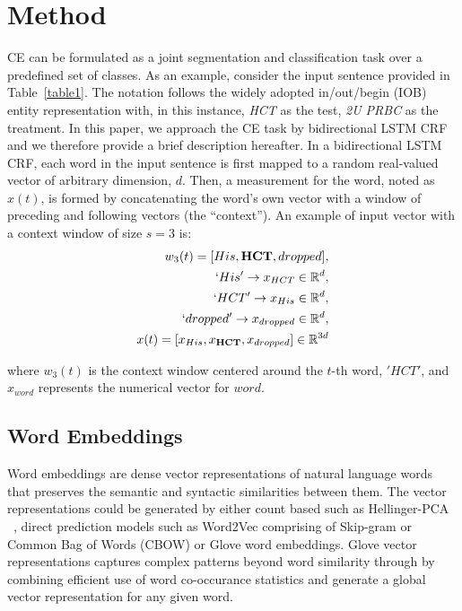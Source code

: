 \section{Method}
\label{sec:method}
CE can be formulated as a joint segmentation and classification task over a predefined set of classes. As an example, consider the input sentence provided in Table~\ref{table1}. The notation follows the widely adopted in/out/begin (IOB) entity representation with, in this instance, \textit{HCT} as the test, \textit{2U PRBC} as the treatment. In this paper, we approach the CE task by bidirectional LSTM CRF and we therefore provide a brief description hereafter. In a bidirectional LSTM CRF, each word in the input sentence is first mapped to a random real-valued  vector of arbitrary dimension, $d$. Then, a measurement for the word, noted as $x(t)$, is formed by concatenating the word's own vector with a window of preceding and following vectors (the ``context''). An example of input vector with a context window of size $s = 3$ is:
\begin{equation}
  \begin{split}
    w_{3}(t) = [His, \textbf{HCT}, dropped], \\
    `His' \rightarrow x_{HCT} \in \mathbb{R}^{d}, \\
    `HCT' \rightarrow x_{His} \in \mathbb{R}^{d}, \\
    `dropped' \rightarrow x_{dropped} \in \mathbb{R}^{d}, \\
    x(t) = [x_{His}, x_{\textbf{HCT}}, x_{dropped}] \in \mathbb{R}^{3d}
  \end{split}
\end{equation}

\noindent where $w_{3}(t)$ is the context window centered around the $t$-th word, $'HCT'$, and $x_{word}$ represents the numerical vector for $word$.


\subsection{Word Embeddings}
Word embeddings are  dense vector  representations of natural language words that preserves the semantic and syntactic similarities between them. The vector representations could be generated by either count based such as Hellinger-PCA ~\cite{lebret2013word}, direct prediction models such as Word2Vec comprising of Skip-gram or Common Bag of Words (CBOW) or Glove word embeddings. Glove vector representations captures complex patterns beyond word similarity through by combining  efficient use of word co-occurance statistics and generate a global vector representation for any given word.

